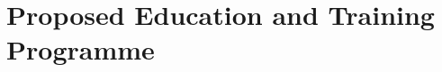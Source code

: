 \documentclass[12pt]{article}
\begin{document}





\section{Proposed Education and Training Programme}
\end{document}
